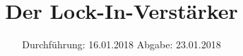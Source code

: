 

\subject{V303}
\title{Der Lock-In-Verstärker}
\date{%
  Durchführung: 16.01.2018
  \hspace{3em}
  Abgabe: 23.01.2018
}



\maketitle
\thispagestyle{empty}
\tableofcontents
\newpage






\printbibliography{}


